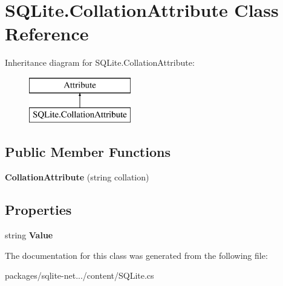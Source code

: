 \hypertarget{classSQLite_1_1CollationAttribute}{}\section{S\+Q\+Lite.\+Collation\+Attribute Class Reference}
\label{classSQLite_1_1CollationAttribute}
Inheritance diagram for S\+Q\+Lite.\+Collation\+Attribute\+:\begin{figure}[H]
\begin{center}
\leavevmode
\includegraphics[height=2.000000cm]{classSQLite_1_1CollationAttribute}
\end{center}
\end{figure}
\subsection*{Public Member Functions}
\begin{DoxyCompactItemize}
\item 
\hypertarget{classSQLite_1_1CollationAttribute_a741b7b18adbbefa4c7922d254c8a3afc}{}{\bfseries Collation\+Attribute} (string collation)\label{classSQLite_1_1CollationAttribute_a741b7b18adbbefa4c7922d254c8a3afc}

\end{DoxyCompactItemize}
\subsection*{Properties}
\begin{DoxyCompactItemize}
\item 
\hypertarget{classSQLite_1_1CollationAttribute_af43921410271a15d87f6c97cf42971b3}{}string {\bfseries Value}\label{classSQLite_1_1CollationAttribute_af43921410271a15d87f6c97cf42971b3}

\end{DoxyCompactItemize}


The documentation for this class was generated from the following file\+:\begin{DoxyCompactItemize}
\item 
packages/sqlite-\/net.../content/S\+Q\+Lite.\+cs\end{DoxyCompactItemize}
